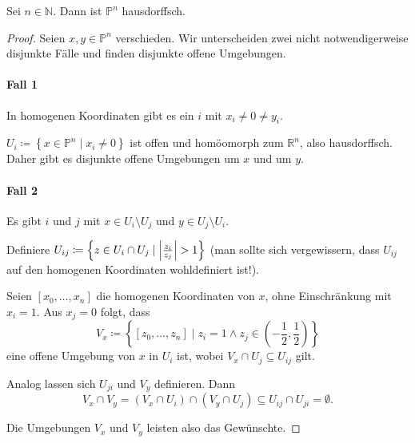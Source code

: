 \documentclass[ngerman, 11pt, a4paper, twoside, abstracton]{scrbook}
\begin{document}
\begin{exercise}
  Sei $n\in\mathbb{N}$. Dann ist $\mathbb{P}^n$ hausdorffsch.
\end{exercise}
\begin{proof}
  Seien $x, y \in \mathbb{P}^n$ verschieden. Wir unterscheiden zwei nicht notwendigerweise disjunkte Fälle und finden disjunkte offene Umgebungen.

  \paragraph{Fall 1} In homogenen Koordinaten gibt es ein $i$ mit $x_i \ne 0 \ne y_i$.
  
  $U_i \coloneqq \left\{ x \in \mathbb{P}^n \mid x_i \ne 0 \right\}$ ist offen und homöomorph zum $\mathbb{R}^n$, also hausdorffsch. Daher gibt es disjunkte offene Umgebungen um $x$ und um $y$.
  \paragraph{Fall 2} Es gibt $i$ und $j$ mit $x\in U_i \setminus U_j$ und $y\in U_j \setminus U_i$.

  Definiere $U_{ij} \coloneqq \left\{ z\in U_i \cap U_j \mid \abs{\frac{z_i}{z_j}} > 1\right\}$ (man sollte sich vergewissern, dass $U_{ij}$ auf den homogenen Koordinaten wohldefiniert ist!).

  Seien $\left[ x_0, \ldots, x_n \right]$ die homogenen Koordinaten von $x$, ohne Einschränkung mit $x_i = 1$. Aus $x_j = 0$ folgt, dass
  \[
    V_x \coloneqq \left\{ \left[ z_0, \ldots, z_n \right] \mid z_i = 1 \land z_j \in \left( -\frac{1}{2}, \frac{1}{2} \right) \right\}
  \]
  eine offene Umgebung von $x$ in $U_i$ ist, wobei $V_x \cap U_j \subseteq U_{ij}$ gilt.

  Analog lassen sich $U_{ji}$ und $V_y$ definieren. Dann
  \[
    V_x \cap V_y = \left( V_x \cap U_i \right) \cap \left( V_y \cap U_j \right) \subseteq U_{ij} \cap U_{ji} = \emptyset.
  \]

  Die Umgebungen $V_x$ und $V_y$ leisten also das Gewünschte.
\end{proof}
\end{document}
